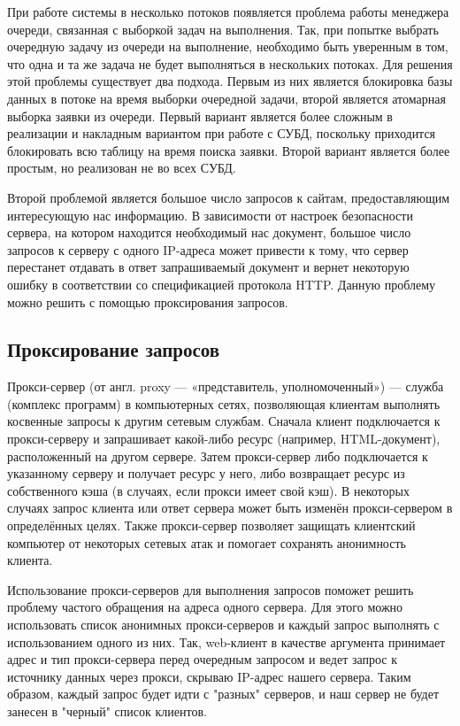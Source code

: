 При работе системы в несколько потоков появляется проблема работы менеджера очереди, связанная с выборкой задач на выполнения. Так, при попытке выбрать очередную задачу из очереди на выполнение, необходимо быть уверенным в том, что одна и та же задача не будет выполняться в нескольких потоках. Для решения этой проблемы существует два подхода. Первым из них является блокировка базы данных в потоке на время выборки очередной задачи, второй является атомарная выборка заявки из очереди. Первый вариант является более сложным в реализации и накладным вариантом при работе с СУБД, поскольку приходится блокировать всю таблицу на время поиска заявки. Второй вариант является более простым, но реализован не во всех СУБД.

Второй проблемой является большое число запросов к сайтам, предоставляющим интересующую нас информацию. В зависимости от настроек безопасности сервера, на котором находится необходимый нас документ, большое число запросов к серверу с одного IP-адреса может привести к тому, что сервер перестанет отдавать в ответ запрашиваемый документ и вернет некоторую ошибку в соответствии со спецификацией протокола HTTP. Данную проблему можно решить с помощью проксирования запросов.

\subsection{Проксирование запросов}

Прокси-сервер (от англ. proxy — «представитель, уполномоченный») — служба (комплекс программ) в компьютерных сетях, позволяющая клиентам выполнять косвенные запросы к другим сетевым службам. Сначала клиент подключается к прокси-серверу и запрашивает какой-либо ресурс (например, HTML-документ), расположенный на другом сервере. Затем прокси-сервер либо подключается к указанному серверу и получает ресурс у него, либо возвращает ресурс из собственного кэша (в случаях, если прокси имеет свой кэш). В некоторых случаях запрос клиента или ответ сервера может быть изменён прокси-сервером в определённых целях. Также прокси-сервер позволяет защищать клиентский компьютер от некоторых сетевых атак и помогает сохранять анонимность клиента.

Использование прокси-серверов для выполнения запросов поможет решить проблему частого обращения на адреса одного сервера. Для этого можно использовать список анонимных прокси-серверов и каждый запрос выполнять с использованием одного из них. Так, web-клиент в качестве аргумента принимает адрес и тип прокси-сервера перед очередным запросом и ведет запрос к источнику данных через прокси, скрываю IP-адрес нашего сервера. Таким образом, каждый запрос будет идти с "разных" серверов, и наш сервер не будет занесен в "черный" список клиентов. 

